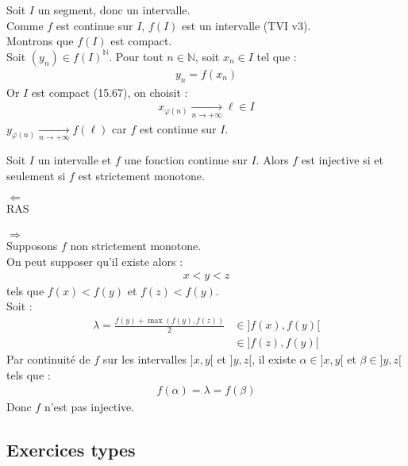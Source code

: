\documentclass[titlepage, twoside]{report}
\begin{document}
\noindent Soit $I$ un segment, donc un intervalle. \\
Comme $f$ est continue sur $I$, $f(I)$ est un intervalle (TVI v3). \\
Montrons que $f(I)$ est compact. \\
Soit $(y_n) \in f(I)^{\mathbb{N}}$. Pour tout $n \in \mathbb{N}$, soit $x_n \in I$ tel que : 
\begin{align*}
    y_n = f(x_n)
\end{align*}
Or $I$ est compact (15.67), on choisit : 
\begin{align*}
    x_{\varphi(n)} \underset{n \to +\infty}{\longrightarrow} \ell \in I
\end{align*}
$y_{\varphi(n)} \underset{n \to +\infty}{\longrightarrow} f(\ell)$ car $f$ est continue sur $I$. 

\begin{tcolorbox}[title=Théorème 15.72, title filled=false, colframe=orange, colback=orange!10!white]
    Soit $I$ un intervalle et $f$ une fonction continue sur $I$. Alors $f$ est injective si et seulement si $f$ est strictement monotone. 
\end{tcolorbox}

$\boxed{\Leftarrow}$ \\
RAS \\ \\

$\boxed{\Rightarrow}$ \\
Supposons $f$ non strictement monotone. \\
On peut supposer qu'il existe alors : 
\begin{align*}
    x < y < z
\end{align*}
tels que $f(x) < f(y)$ et $f(z) < f(y)$. \\
Soit :
\begin{align*}
    \lambda = \frac{f(y) + \max(f(y), f(z))}{2} &\in ]f(x), f(y)[ \\
    &\in ]f(z), f(y)[
\end{align*}
Par continuité de $f$ sur les intervalles $]x, y[$ et $]y, z[$, il existe $\alpha \in ]x, y[$ et $\beta \in ]y, z[$ tels que : 
\begin{align*}
    f(\alpha) = \lambda = f(\beta)
\end{align*}
Donc $f$ n'est pas injective. 


\subsection{Exercices types}
\end{document}
